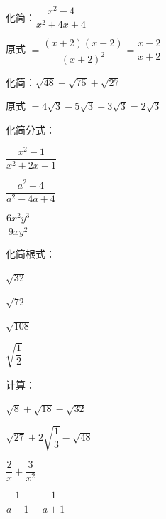 \documentclass[a4paper,12pt]{ctexart}
\begin{document}
\begin{example}
化简：$\dfrac{x^2-4}{x^2+4x+4}$
\end{example}
\begin{solution}
原式 $=\dfrac{(x+2)(x-2)}{(x+2)^2}=\dfrac{x-2}{x+2}$
\end{solution}



\begin{example}
化简：$\sqrt{48}-\sqrt{75}+\sqrt{27}$
\end{example}
\begin{solution}
原式 $=4\sqrt3-5\sqrt3+3\sqrt3=2\sqrt3$
\end{solution}


\begin{exercise}
\item 化简分式：
  \begin{subexercise}
    \item $\dfrac{x^2-1}{x^2+2x+1}$
    \item $\dfrac{a^2-4}{a^2-4a+4}$
    \item $\dfrac{6x^2y^3}{9xy^2}$
  \end{subexercise}

\item 化简根式：
  \begin{subexercise}
    \item $\sqrt{32}$
    \item $\sqrt{72}$
    \item $\sqrt{108}$
    \item $\sqrt{\dfrac{1}{2}}$
  \end{subexercise}

\item 计算：
  \begin{subexercise}
    \item $\sqrt{8}+\sqrt{18}-\sqrt{32}$
    \item $\sqrt{27}+2\sqrt{\dfrac13}-\sqrt{48}$
    \item $\dfrac{2}{x}+\dfrac{3}{x^2}$
    \item $\dfrac{1}{a-1}-\dfrac{1}{a+1}$
  \end{subexercise}
\end{exercise}
\end{document}
